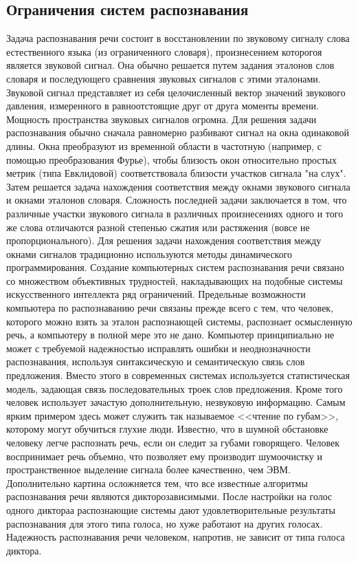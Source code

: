 \documentclass[14pt,russian,utf8,nocolumnsxix]{extarticle}
\begin{document}
\subsection{Ограничения систем распознавания}
Задача распознавания речи состоит в восстановлении по звуковому сигналу слова естественного языка (из ограниченного словаря), произнесением которогоя является звуковой сигнал. Она обычно решается путем задания эталонов слов словаря и последующего сравнения звуковых сигналов с этими эталонами. Звуковой сигнал представляет из себя целочисленный вектор значений звукового давления, измеренного в равноотстоящие друг от друга моменты времени. Мощность пространства звуковых сигналов огромна. Для решения задачи распознавания обычно сначала равномерно разбивают сигнал на окна одинаковой длины. Окна преобразуют из временной области в частотную (например, с помощью преобразования Фурье), чтобы близость окон относительно простых метрик (типа Евклидовой) соответствовала близости участков сигнала "на слух". Затем решается задача нахождения соответствия между окнами звукового сигнала и окнами эталонов словаря. Сложность последней задачи заключается в том, что различные участки звукового сигнала в различных произнесениях одного и того же слова отличаются разной степенью сжатия или растяжения (вовсе не пропорционального). Для решения задачи нахождения соответствия между окнами сигналов традиционно используются методы динамического программирования. Создание компьютерных систем распознавания речи связано со множеством объективных трудностей, накладывающих на подобные системы искусственного интеллекта ряд ограничений.
Предельные возможности компьютера по распознаванию речи связаны прежде всего с тем, что человек, которого можно взять за эталон распознающей системы, распознает осмысленную речь, а компьютеру в полной мере это не дано. Компьютер принципиально не может с требуемой надежностью исправлять ошибки и неоднозначности распознавания, используя синтаксическую и семантическую связь слов предложения. Вместо этого в современных системах используется статистическая модель, задающая связь последовательных троек слов предложения. Кроме того человек использует зачастую дополнительную, незвуковую информацию. Самым ярким примером здесь может служить так называемое <<чтение по губам>>, которому могут обучиться глухие люди. Известно, что в шумной обстановке человеку легче распознать речь, если он следит за губами говорящего. Человек воспринимает речь объемно, что позволяет ему производит шумоочистку и пространственное выделение сигнала более качественно, чем ЭВМ.
Дополнительно картина осложняется тем, что все известные алгоритмы распознавания речи являются дикторозависимыми. После настройки на голос одного диктораа распознающие системы дают удовлетворительные результаты распознавания для этого типа голоса, но хуже работают на других голосах. Надежность распознавания речи человеком, напротив, не зависит от типа голоса диктора.\cite{mazurenko}
\end{document}
